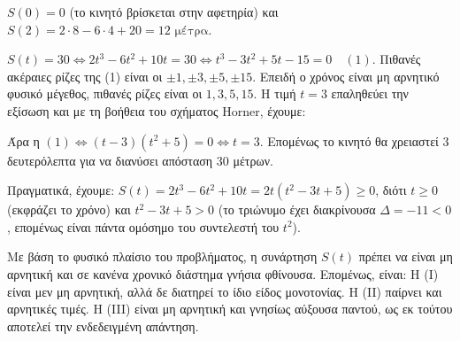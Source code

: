 \begin{alist}
\item $S(0) = 0$ (το κινητό βρίσκεται στην αφετηρία) και $S(2) = 2 \cdot 8 - 6 \cdot 4 + 20 = 12 \text{ μέτρα}$.
\item $S(t) = 30 \Leftrightarrow 2t^3 - 6t^2 + 10t = 30 \Leftrightarrow t^3 - 3t^2 + 5t - 15 = 0 \quad (1)$.
Πιθανές ακέραιες ρίζες της (1) είναι οι $\pm 1, \pm 3, \pm 5, \pm 15$. Επειδή ο χρόνος είναι μη αρνητικό φυσικό μέγεθος, πιθανές ρίζες είναι οι $1, 3, 5, 15$.
Η τιμή $t = 3$ επαληθεύει την εξίσωση και με τη βοήθεια του σχήματος Horner, έχουμε:
\begin{center}
\end{center}
Άρα η $(1) \Leftrightarrow (t - 3)(t^2 + 5) = 0 \Leftrightarrow t = 3$.
Επομένως το κινητό θα χρειαστεί 3 δευτερόλεπτα για να διανύσει απόσταση 30 μέτρων.
\item Πραγματικά, έχουμε:
$S(t) = 2t^3 - 6t^2 + 10t = 2t(t^2 - 3t + 5) \ge 0$,
διότι $t \ge 0$ (εκφράζει το χρόνο)
και $t^2 - 3t + 5 > 0$ (το τριώνυμο έχει διακρίνουσα $\Delta = -11 < 0$, επομένως είναι πάντα ομόσημο του συντελεστή του $t^2$).
\item Με βάση το φυσικό πλαίσιο του προβλήματος, η συνάρτηση $S(t)$ πρέπει να είναι μη αρνητική και σε κανένα χρονικό διάστημα γνήσια φθίνουσα. Επομένως, είναι:
Η (I) είναι μεν μη αρνητική, αλλά δε διατηρεί το ίδιο είδος μονοτονίας.
Η (II) παίρνει και αρνητικές τιμές.
Η (III) είναι μη αρνητική και γνησίως αύξουσα παντού, ως εκ τούτου αποτελεί την ενδεδειγμένη απάντηση.
\end{alist}


